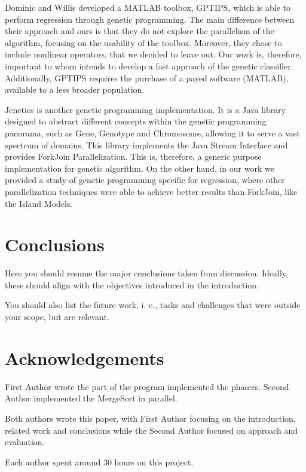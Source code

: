 \documentclass[runningheads]{llncs}
\begin{document}
Dominic and Willis  \cite{GPTIPS} developed a MATLAB toolbox, GPTIPS, which is able to perform regression through genetic programming. The main difference between their approach and  ours is that they do not explore the parallelism of the algorithm, focusing on the usability of the toolbox. Moreover, they chose to include nonlinear operators, that we decided to leave out. Our work is, therefore, important to whom intends to develop a fast approach of the genetic classifier. Additionally, GPTIPS requires the purchase of a payed software (MATLAB), available to a less broader population.

Jenetics \cite{jenetics} is another genetic programming implementation. It is a Java library designed to abstract different concepts within the genetic programming panorama, such as Gene, Genotype and Chromosome, allowing it to serve a vast spectrum of domains. This library implements the Java Stream Interface and provides ForkJoin Parallelization. This is, therefore, a generic purpose implementation for genetic algorithm. On the other hand, in our work we provided a study of genetic programming specific for regression, where other parallelization techniques were able to achieve better results than ForkJoin, like the Island Models.

\section{Conclusions}

Here you should resume the major conclusions taken from discussion. Ideally, these should align with the objectives introduced in the introduction.


You should also list the future work, i. e., tasks and challenges that were outside your scope, but are relevant.

\section*{Acknowledgements}

First Author wrote the part of the program implemented the phasers. Second Author implemented the MergeSort in parallel. 

Both authors wrote this paper, with First Author focusing on the introduction, related work and conclusions while the Second Author focused on approach and evaluation.

Each author spent around 30 hours on this project.



\end{document}
